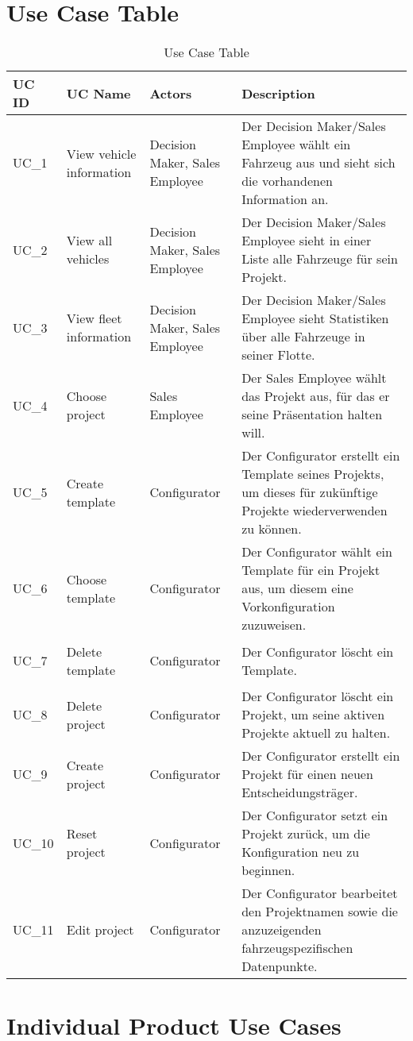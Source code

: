 \section{Use Case Table}
\sffamily
\begin{footnotesize}
  \renewcommand{\arraystretch}{1.4}
  \begin{longtable}[i i i L]{ p{} p{} p{} p{} }
    \caption                       %
        {Use Case Table} %
        \\
    \toprule
    \textbf{UC ID} & \textbf{UC Name} & \textbf{Actors}  & \textbf{Description}\\
    \midrule
    \hypertarget{Ref:UC1}{UC\_1} & View vehicle information & Decision Maker, Sales Employee & Der Decision Maker/Sales Employee wählt ein Fahrzeug aus und sieht sich die vorhandenen Information an. \\
    \hypertarget{Ref:UC2}{UC\_2} & View all vehicles & Decision Maker, Sales Employee & Der Decision Maker/Sales Employee sieht in einer Liste alle Fahrzeuge für sein Projekt. \\
    \hypertarget{Ref:UC3}{UC\_3}  & View fleet information & Decision Maker, Sales Employee & Der Decision Maker/Sales Employee sieht Statistiken über alle Fahrzeuge in seiner Flotte. \\
    \hypertarget{Ref:UC4}{UC\_4}  & Choose project & Sales Employee & Der Sales Employee wählt das Projekt aus, für das er seine Präsentation halten will. \\
    \hypertarget{Ref:UC5}{UC\_5}  & Create template & Configurator & Der Configurator erstellt ein Template seines Projekts, um dieses für zukünftige Projekte wiederverwenden zu können. \\
    \hypertarget{Ref:UC6}{UC\_6} & Choose template & Configurator & Der Configurator wählt ein Template für ein Projekt aus, um diesem eine Vorkonfiguration zuzuweisen. \\
    \hypertarget{Ref:UC7}{UC\_7} & Delete template & Configurator & Der Configurator löscht ein Template. \\
    \hypertarget{Ref:UC8}{UC\_8} & Delete project & Configurator & Der Configurator löscht ein Projekt, um seine aktiven Projekte aktuell zu halten. \\
    \hypertarget{Ref:UC9}{UC\_9} & Create project & Configurator & Der Configurator erstellt ein Projekt für einen neuen Entscheidungsträger. \\
    \hypertarget{Ref:U10}{UC\_10} & Reset project & Configurator & Der Configurator setzt ein Projekt zurück, um die Konfiguration neu zu beginnen. \\
    \hypertarget{Ref:UC11}{UC\_11} & Edit project & Configurator & Der Configurator bearbeitet den Projektnamen sowie die anzuzeigenden fahrzeugspezifischen Datenpunkte. \\
    \bottomrule
  \end{longtable}
\end{footnotesize}
\rmfamily

\section{Individual Product Use Cases}
